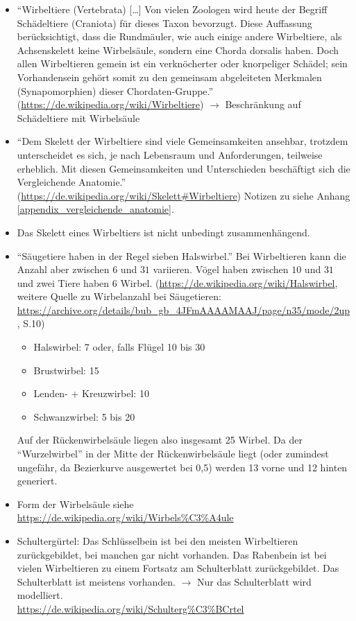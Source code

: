 \begin{itemize}
 \item "`Wirbeltiere (Vertebrata) [\dots] Von vielen Zoologen wird heute der Begriff Schädeltiere (Craniota) für dieses Taxon bevorzugt. Diese Auffassung berücksichtigt, dass die Rundmäuler, wie auch einige andere Wirbeltiere, als Achsenskelett keine Wirbelsäule, sondern eine Chorda dorsalis haben. Doch allen Wirbeltieren gemein ist ein verknöcherter oder knorpeliger Schädel; sein Vorhandensein gehört somit zu den gemeinsam abgeleiteten Merkmalen (Synapomorphien) dieser Chordaten-Gruppe."' (\url{https://de.wikipedia.org/wiki/Wirbeltiere}) $\rightarrow$ Beschränkung auf Schädeltiere mit Wirbelsäule
 \item "`Dem Skelett der Wirbeltiere sind viele Gemeinsamkeiten ansehbar, trotzdem unterscheidet es sich, je nach Lebensraum und Anforderungen, teilweise erheblich. Mit diesen Gemeinsamkeiten und Unterschieden beschäftigt sich die Vergleichende Anatomie."' (\url{https://de.wikipedia.org/wiki/Skelett#Wirbeltiere}) Notizen zu \cite{Vergleichende_Anatomie} siehe Anhang \ref{appendix_vergleichende_anatomie}.
 \item Das Skelett eines Wirbeltiers ist nicht unbedingt zusammenhängend.
 
 \item "`Säugetiere haben in der Regel sieben Halswirbel."' Bei Wirbeltieren kann die Anzahl aber zwischen $6$ und $31$ variieren. Vögel haben zwischen $10$ und $31$ und zwei Tiere haben $6$ Wirbel. (\url{https://de.wikipedia.org/wiki/Halswirbel}, weitere Quelle zu Wirbelanzahl bei Säugetieren: \url{https://archive.org/details/bub_gb_4JFmAAAAMAAJ/page/n35/mode/2up}, S.10)
    \begin{itemize}
     \item Halswirbel: 7 oder, falls Flügel 10 bis 30
     \item Brustwirbel: 15
     \item Lenden- + Kreuzwirbel: 10
     \item Schwanzwirbel: 5 bis 20
    \end{itemize}
 Auf der Rückenwirbelsäule liegen also insgesamt 25 Wirbel.   
 Da der "`Wurzelwirbel"' in der Mitte der Rückenwirbelsäule liegt (oder zumindest ungefähr, da Bezierkurve ausgewertet bei 0,5) werden 13 vorne und 12 hinten generiert.

 
 \item Form der Wirbelsäule siehe \url{https://de.wikipedia.org/wiki/Wirbels\%C3\%A4ule}
 
 \item Schultergürtel: Das Schlüsselbein ist bei den meisten Wirbeltieren zurückgebildet, bei manchen gar nicht vorhanden. Das Rabenbein ist bei vielen Wirbeltieren zu einem Fortsatz am Schulterblatt zurückgebildet. Das Schulterblatt ist meistens vorhanden. $\rightarrow$ Nur das Schulterblatt wird modelliert.\\
 \url{https://de.wikipedia.org/wiki/Schulterg\%C3\%BCrtel}
 

\end{itemize}
